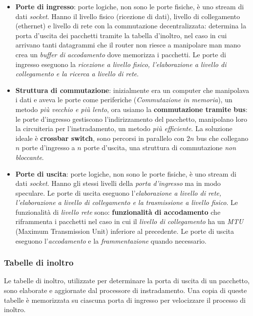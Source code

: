 \begin{itemize}
  \item \textbf{Porte di ingresso}: porte logiche, non sono le porte fisiche, è uno stream di dati \textit{socket}. Hanno il livello fisico (ricezione di dati), livello di collegamento (ethernet) e livello di rete con la commutazione decentralizzata: determina la porta d'uscita dei pacchetti tramite la tabella d'inoltro, nel caso in cui arrivano tanti datagrammi che il router non riesce a manipolare man mano crea un \textit{buffer di accodamento} dove memorizza i pacchetti. Le porte di ingresso eseguono la \textit{ricezione a livello fisico, l'elaborazione a livello di collegamento e la ricerca a livello di rete}.
  \item \textbf{Struttura di commutazione}: inizialmente era un computer che manipolava i dati e aveva le porte come periferiche (\textit{Commutazione in memoria}), un metodo \textit{più vecchio e più lento}, ora usiamo la \textbf{commutazione tramite bus}: le porte d'ingresso gestiscono l'indirizzamento del pacchetto, manipolano loro la circuiteria per l'instradamento, un metodo \textit{più efficiente}. La soluzione ideale è \textbf{crossbar switch}, sono percorsi in parallelo con $2n$ bus che collegano $n$ porte d'ingresso a $n$ porte d'uscita, una struttura di commutazione \textit{non bloccante}.
  \item \textbf{Porte di uscita}: porte logiche, non sono le porte fisiche, è uno stream di dati \textit{socket}. Hanno gli stessi livelli della \textit{porta d'ingresso} ma in modo speculare. Le porte di uscita eseguono l'\textit{elaborazione a livello di rete, l'elaborazione a livello di collegamento e la trasmissione a livello fisico}. Le funzionalità di \textit{livello rete} sono: \textbf{funzionalità di accodamento} che riframmenta i pacchetti nel caso in cui il \textit{livello di collegamento} ha un \textit{MTU} (Maximum Transmission Unit) inferiore al precedente. Le porte di uscita eseguono l'\textit{accodamento} e la \textit{frammentazione} quando necessario.
\end{itemize}

\subsubsection{Tabelle di inoltro}
Le tabelle di inoltro, utilizzate per determinare la porta di uscita di un pacchetto, sono elaborate e aggiornate dal processore di instradamento. Una copia di queste tabelle è memorizzata su ciascuna porta di ingresso per velocizzare il processo di inoltro.

